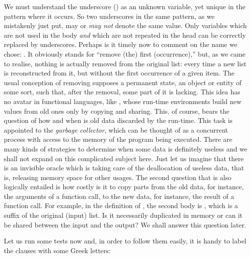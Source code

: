 We must understand the underscore (\erlcode{\_}) as an unknown
variable, yet unique in the pattern where it occurs. So two
underscores in the same pattern, as we mistakenly just put, may or
\emph{may not} denote the same value. Only variables which are not
used in the body \emph{and} which are not repeated in the head can be
correctly replaced by underscores. Perhaps is it timely now to comment
on the name we chose: . It obviously stands for
``remove (the) first (occurrence),'' but, as we came to realise, nothing
is actually removed from the original list: every time a new list is
reconstructed from it, but without the first occurrence of a given
item. The usual conception of removing supposes a permanent state, an
object or entity of some sort, such that, after the removal, some part
of it is lacking. This idea has no avatar in functional languages,
like \Erlang, whose run\hyp{}time environments build new values from
old ones only by copying and sharing. This, of course, bears the
question of how and when is old data discarded by the
run\hyp{}time. This task is appointed to the \emph{garbage collector},
which can be thought of as a concurrent process with access to the
memory of the program being executed. There are many kinds of
strategies to determine when some data is definitely useless and we
shall not expand on this complicated subject here. Just let us imagine
that there is an invisible oracle which is taking care of the
deallocation of useless data, that is, releasing memory space for other
usages. The second question that is also logically entailed is how
costly is it to copy parts from the old data, for instance, the arguments of a
function call, to the new data, for instance, the result of a function
call. For example, in the definition of , the
second body is , which is a suffix of the original (input)
list. Is it necessarily duplicated in memory or can it be shared
between the input and the output? We shall answer this question later.

Let us run some tests now and, in order to follow them easily, it is
handy to label the clauses with some Greek
letters:\label{code:rm_fst_alpha}



